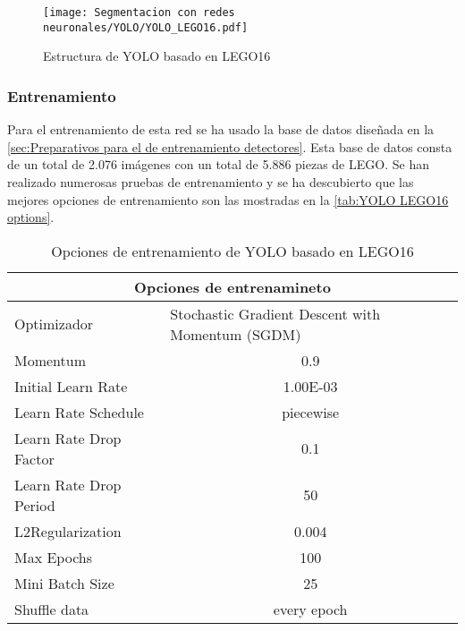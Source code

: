 \begin{figure}[ht]  %
	\centering
	\texttt{[image: Segmentacion con redes neuronales/YOLO/YOLO\_LEGO16.pdf]}
	\caption{Estructura de YOLO basado en LEGO16}
	\label{fig:YOLO LEGO16 estructura}
\end{figure}

\subsubsection*{Entrenamiento}
Para el entrenamiento de esta red se ha usado la base de datos diseñada en la \autoref{sec:Preparativos para el de entrenamiento detectores}. Esta base de datos consta de un total de 2.076 imágenes con un total de 5.886 piezas de LEGO. Se han realizado numerosas pruebas de entrenamiento y se ha descubierto que las mejores opciones de entrenamiento son las mostradas en la \autoref{tab:YOLO LEGO16 options}.

\begin{table}[ht]
  \centering
    \begin{tabular}{|l|c|}
    \hline
    \multicolumn{2}{|c|}{Opciones de entrenamineto} \\
    \hline
    Optimizador & \multicolumn{1}{l|}{Stochastic Gradient Descent with Momentum (SGDM)} \\
    \hline
    Momentum & 0.9 \\
    \hline
    Initial Learn Rate & 1.00E-03 \\
    \hline
    Learn Rate Schedule & piecewise \\
    \hline
    Learn Rate Drop Factor & 0.1 \\
    \hline
    Learn Rate Drop Period & 50 \\
    \hline
    L2Regularization & 0.004 \\
    \hline
    Max Epochs & 100 \\
    \hline
    Mini Batch Size & 25 \\
    \hline
    Shuffle data & every epoch \\
    \hline
    \end{tabular}%
  \caption{Opciones de entrenamiento de YOLO basado en LEGO16}
  \label{tab:YOLO LEGO16 options}%
\end{table}%



